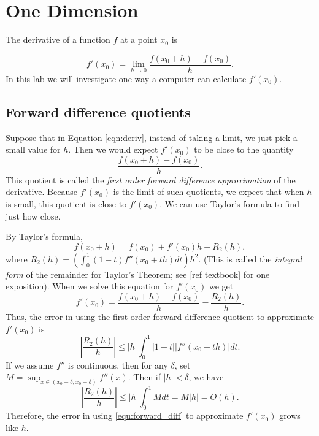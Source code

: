 \label{Ch:Numerical Derivatives}


\section*{One Dimension}
The derivative of a function $f$ at a point $x_0$ is

\begin{equation}
\label{eqn:deriv}
f'(x_0) = \lim_{h\rightarrow 0} \frac{f(x_0 + h)-f(x_0)}{h}.
\end{equation}
In this lab we will investigate one way a computer can calculate $f'(x_0)$. 

\subsection*{Forward difference quotients}
Suppose that in Equation \ref{eqn:deriv}, instead of taking a limit, we just pick a small value for $h$. Then we would expect $f'(x_0)$ to be close to the quantity
\begin{equation}\label{equ:forward_diff}
 \frac{f(x_0 + h)-f(x_0)}{h}.
\end{equation}
This quotient is called the \emph{first order forward difference approximation} of the derivative. Because $f'(x_0)$ is the limit of such quotients, we expect that when $h$ is small, this quotient is close to $f'(x_0)$. We can use Taylor's formula to find just how close.

By Taylor's formula,
\[
f(x_0+h) = f(x_0) + f'(x_0)h + R_2(h),
\]
where $R_2(h) = \left( \int_0^1 (1-t) f''(x_0+th) dt \right) h^2$. (This is called the \emph{integral form} of the remainder for Taylor's Theorem; see [ref textbook] for one exposition). When we solve this equation for $f'(x_0)$ we get
\begin{equation}\label{equ:forward_diff_with_remainder}
f'(x_0) = \frac{f(x_0+h)-f(x_0)}{h} - \frac{R_2(h)}{h}.
\end{equation}
Thus, the error in using the first order forward difference quotient to approximate $f'(x_0)$ is 
\[
\left | \frac{R_2(h)}{h} \right | \leq |h| \int_0^1 |1 - t||f''(x_0+th)|dt.
\]
If we assume $f''$ is continuous, then for any $\delta$, set $M = \sup_{x \in (x_0-\delta, x_0+\delta)} f''(x)$. Then if $|h| < \delta$, we have
\[
\left | \frac{R_2(h)}{h} \right | \leq |h|\int_0^1 M dt = M|h| = O(h).
\]
Therefore, the error in using \eqref{equ:forward_diff} to approximate $f'(x_0)$ grows like $h$.



